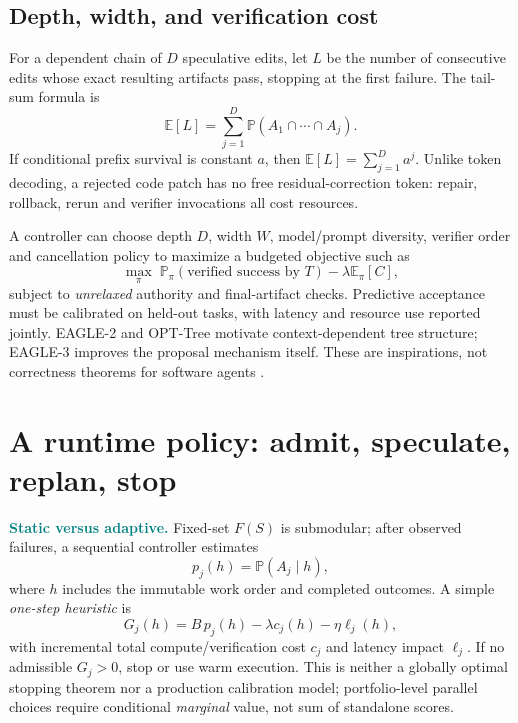 \documentclass[10pt,twocolumn]{article}
\newcommand{\Claim}[1]{\noindent\textcolor{teal}{\textbf{#1}}\;}
\newcommand{\1}{\mathbf{1}}
\newcommand{\Prb}{\mathbb{P}}
\newcommand{\E}{\mathbb{E}}
\begin{document}
\subsection{Depth, width, and verification cost}
For a dependent chain of $D$ speculative edits, let $L$ be the number of consecutive edits whose exact resulting artifacts pass, stopping at the first failure. The tail-sum formula is
\begin{equation}
\label{eq:prefix}
\E[L]=\sum_{j=1}^D \Prb(A_1\cap\cdots\cap A_j).
\end{equation}
If conditional prefix survival is constant $a$, then $\E[L]=\sum_{j=1}^D a^j$. Unlike token decoding, a rejected code patch has no free residual-correction token: repair, rollback, rerun and verifier invocations all cost resources.

A controller can choose depth $D$, width $W$, model/prompt diversity, verifier order and cancellation policy to maximize a budgeted objective such as
\begin{equation}
\label{eq:objective}
\max_{\pi}\;\Prb_{\pi}(\text{verified success by }T)
 -\lambda\E_{\pi}[C],
\end{equation}
subject to \emph{unrelaxed} authority and final-artifact checks. Predictive acceptance must be calibrated on held-out tasks, with latency and resource use reported jointly. EAGLE-2 and OPT-Tree motivate context-dependent tree structure; EAGLE-3 improves the proposal mechanism itself. These are inspirations, not correctness theorems for software agents \cite{eagle2,eagle3,opttree}.

\section{A runtime policy: admit, speculate, replan, stop}
\Claim{Static versus adaptive.} Fixed-set $F(S)$ is submodular; after observed failures, a sequential controller estimates
\begin{equation}
 p_j(h)=\Prb(A_j\mid h),
\end{equation}
where $h$ includes the immutable work order and completed outcomes. A simple \emph{one-step heuristic} is
\begin{equation}
 G_j(h)=B\,p_j(h)-\lambda c_j(h)-\eta\ell_j(h),
\end{equation}
with incremental total compute/verification cost $c_j$ and latency impact $\ell_j$. If no admissible $G_j>0$, stop or use warm execution. This is neither a globally optimal stopping theorem nor a production calibration model; portfolio-level parallel choices require conditional \emph{marginal} value, not sum of standalone scores.
\end{document}
